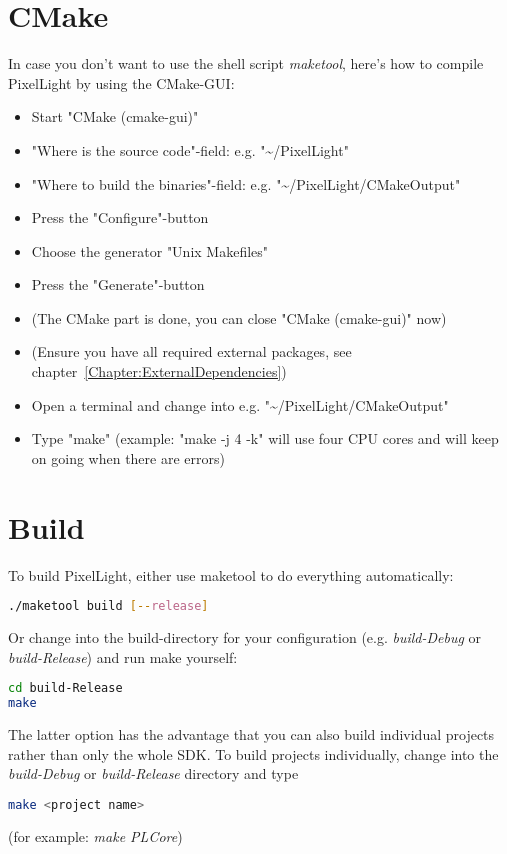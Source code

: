 \section{CMake}
In case you don't want to use the shell script \emph{maketool}, here's how to compile PixelLight by using the CMake-GUI:
\begin{itemize}
\item{Start "CMake (cmake-gui)"}
\item{"Where is the source code"-field: e.g. "\textasciitilde /PixelLight"}
\item{"Where to build the binaries"-field: e.g. "\textasciitilde /PixelLight/CMakeOutput"}
\item{Press the "Configure"-button}
\item{Choose the generator "Unix Makefiles"}
\item{Press the "Generate"-button}
\item{(The CMake part is done, you can close "CMake (cmake-gui)" now)}
\item{(Ensure you have all required external packages, see chapter~\ref{Chapter:ExternalDependencies})}
\item{Open a terminal and change into e.g. "\textasciitilde /PixelLight/CMakeOutput"}
\item{Type "make" (example: "make -j 4 -k" will use four CPU cores and will keep on going when there are errors)}
\end{itemize}




\section{Build}
To build PixelLight, either use maketool to do everything automatically:
\begin{lstlisting}[language=bash]
./maketool build [--release]
\end{lstlisting}

Or change into the build-directory for your configuration (e.g. \emph{build-Debug} or \emph{build-Release}) and run make yourself:
\begin{lstlisting}[language=bash]
cd build-Release
make
\end{lstlisting}

The latter option has the advantage that you can also build individual projects rather than only the whole SDK. To build projects individually, change into the \emph{build-Debug} or \emph{build-Release} directory and type
\begin{lstlisting}[language=bash]
make <project name>
\end{lstlisting}
(for example: \emph{make PLCore})

